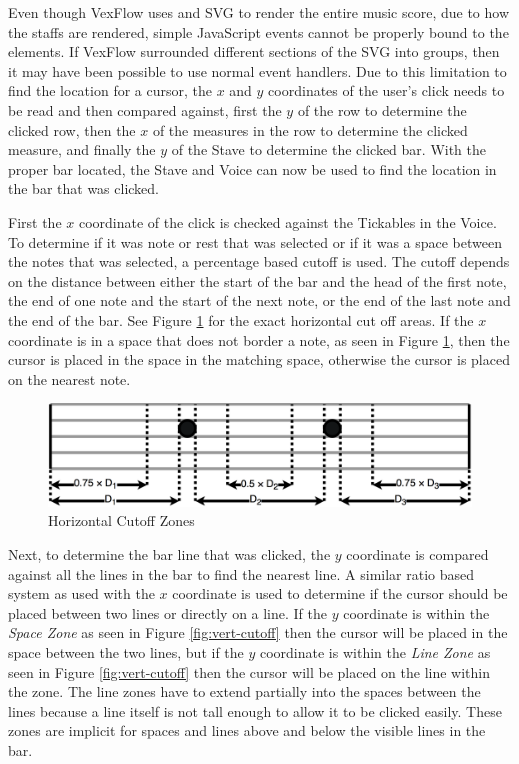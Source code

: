 \documentclass[letterpaper,12pt]{article}
\begin{document}
Even though VexFlow uses and SVG to render the entire music score, due to how the staffs are rendered, simple JavaScript
events cannot be properly bound to the elements. If VexFlow surrounded different sections of the SVG into groups, then
it may have been possible to use normal event handlers. Due to this limitation to find the location for a cursor, the
$ x $ and $ y $ coordinates of the user's click needs to be read and then compared against, first the $ y $ of the row
to determine the clicked row, then the $ x $ of the measures in the row to determine the clicked measure, and finally
the $ y $ of the Stave to determine the clicked bar. With the proper bar located, the Stave and Voice can now be used to
find the location in the bar that was clicked.

First the $ x $ coordinate of the click is checked against the Tickables in the Voice. To determine if it was note
or rest that was selected or if it was a space between the notes that was selected, a percentage based cutoff is used.
The cutoff depends on the distance between either the start of the bar and the head of the first note, the end of one
note and the start of the next note, or the end of the last note and the end of the bar. See Figure
\ref{fig:hori-cutoff} for the exact horizontal cut off areas. If the $ x $ coordinate is in a space that does not border
a note, as seen in Figure \ref{fig:hori-cutoff}, then the cursor is placed in the space in the matching space, otherwise
the cursor is placed on the nearest note.

\begin{figure}[H]
    \begin{center}
        \includegraphics[scale=0.2]{imgs/hori-cutoff.png}
    \end{center}
    \caption{Horizontal Cutoff Zones}
    \label{fig:hori-cutoff}
\end{figure}

Next, to determine the bar line that was clicked, the $ y $ coordinate is compared against all the lines in the bar to
find the nearest line. A similar ratio based system as used with the $ x $ coordinate is used to determine if the cursor
should be placed between two lines or directly on a line. If the $ y $ coordinate is within the \textit{Space Zone} as
seen in Figure \ref{fig:vert-cutoff} then the cursor will be placed in the space between the two lines, but if the $ y $
coordinate is within the \textit{Line Zone} as seen in Figure \ref{fig:vert-cutoff} then the cursor will be placed on
the line within the zone. The line zones have to extend partially into the spaces between the lines because a line
itself is not tall enough to allow it to be clicked easily. These zones are implicit for spaces and lines above and
below the visible lines in the bar.
\end{document}
